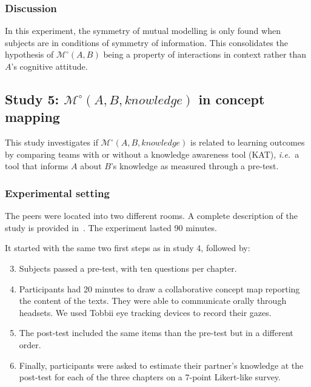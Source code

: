 \documentclass[natbib]{svjour3}
\newcommand{\ie}{{\textit{i.e.\ }}}
\newcommand{\Model}[3]{{$\mathcal{M}^{\circ}(#1, #2, #3)$}}
\newcommand{\gModel}[2]{{$\mathcal{M}^{\circ}(#1, #2)$}}
\begin{document}
\subsubsection*{Discussion}

In this experiment, the symmetry of mutual modelling is only found when subjects
are in conditions of symmetry of information. This consolidates the hypothesis
of \gModel{A}{B} being a property of interactions in context rather than $A$'s
cognitive attitude.



\subsection{{\bf Study 5}: \Model{A}{B}{knowledge} in concept mapping}

This study investigates if \Model{A}{B}{knowledge} is related to learning
outcomes by comparing teams with or without a knowledge awareness tool (KAT),
\ie a tool that informs $A$ about $B$'s knowledge as measured through a pre-test.

\subsubsection*{Experimental setting}

The peers were located into two different rooms. A complete description of the
study is provided in~\citet{sangin2008learners}. The experiment lasted 90 minutes.

It started with the same two first steps as in study 4, followed by:

\begin{enumerate}
    \setcounter{enumi}{2}

    \item Subjects passed a pre-test, with ten questions per chapter. 

    \item Participants had 20 minutes to draw a collaborative concept map
        reporting the content of the texts. They were able to communicate
        orally through headsets.  We used Tobbii eye tracking devices to
        record their gazes.

    \item The post-test included the same items than the pre-test but in a
        different order. 

    \item  Finally, participants were asked to estimate their partner's
        knowledge at the post-test for each of the three chapters on a 7-point
        Likert-like survey. 

\end{enumerate}
\end{document}
